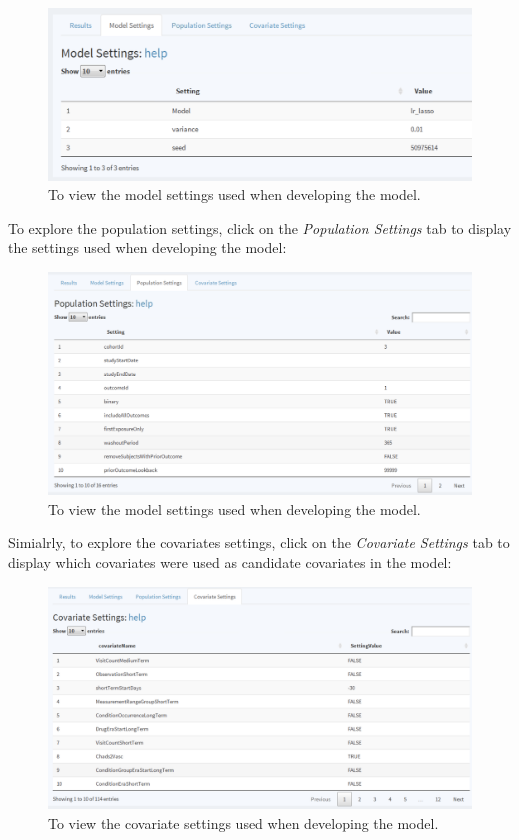 \documentclass[11pt]{book}
\begin{document}
\begin{figure}

{\centering \includegraphics[width=0.8\linewidth]{images/PatientLevelPrediction/shiny/shinyModel} 

}

\caption{To view the model settings used when developing the model.}\label{fig:shinyModel}
\end{figure}

To explore the population settings, click on the \emph{Population
Settings} tab to display the settings used when developing the model:

\begin{figure}

{\centering \includegraphics[width=0.8\linewidth]{images/PatientLevelPrediction/shiny/shinyPopSet} 

}

\caption{To view the model settings used when developing the model.}\label{fig:shinyPopSet}
\end{figure}

Simialrly, to explore the covariates settings, click on the
\emph{Covariate Settings} tab to display which covariates were used as
candidate covariates in the model:

\begin{figure}

{\centering \includegraphics[width=0.8\linewidth]{images/PatientLevelPrediction/shiny/shinyCovSet} 

}

\caption{To view the covariate settings used when developing the model.}\label{fig:shinyCovSet}
\end{figure}
\end{document}
